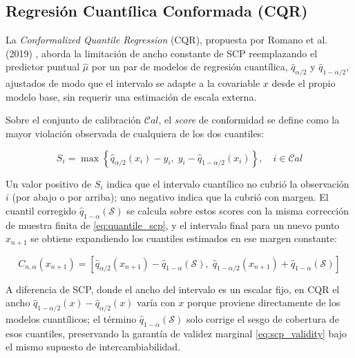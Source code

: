 \subsection{Regresión Cuantílica Conformada (CQR)}
\label{sec:cqr}

La \textit{Conformalized Quantile Regression} (CQR), propuesta por Romano et al. (2019) \cite{RomanoCQR}, aborda la limitación de ancho constante de SCP reemplazando el predictor puntual $\hat{\mu}$ por un par de modelos de regresión cuantílica, $\hat{q}_{\alpha/2}$ y $\hat{q}_{1-\alpha/2}$, ajustados de modo que el intervalo se adapte a la covariable $x$ desde el propio modelo base, sin requerir una estimación de escala externa.

Sobre el conjunto de calibración $\mathcal{C}al$, el \textit{score} de conformidad se define como la mayor violación observada de cualquiera de los dos cuantiles:

\begin{equation}
    S_i = \max\left\{\hat{q}_{\alpha/2}(x_i) - y_i,\; y_i - \hat{q}_{1-\alpha/2}(x_i)\right\}, \quad i \in \mathcal{C}al
    \label{eq:cqr_score}
\end{equation}

Un valor positivo de $S_i$ indica que el intervalo cuantílico no cubrió la observación $i$ (por abajo o por arriba); uno negativo indica que la cubrió con margen. El cuantil corregido $\hat{q}_{1-\alpha}(\mathcal{S})$ se calcula sobre estos scores con la misma corrección de muestra finita de \eqref{eq:quantile_scp}, y el intervalo final para un nuevo punto $x_{n+1}$ se obtiene expandiendo los cuantiles estimados en ese margen constante:

\begin{equation}
    C_{n,\alpha}(x_{n+1}) = \left[\hat{q}_{\alpha/2}(x_{n+1}) - \hat{q}_{1-\alpha}(\mathcal{S}),\; \hat{q}_{1-\alpha/2}(x_{n+1}) + \hat{q}_{1-\alpha}(\mathcal{S})\right]
    \label{eq:cqr_interval}
\end{equation}

A diferencia de SCP, donde el ancho del intervalo es un escalar fijo, en CQR el ancho $\hat{q}_{1-\alpha/2}(x) - \hat{q}_{\alpha/2}(x)$ varía con $x$ porque proviene directamente de los modelos cuantílicos; el término $\hat{q}_{1-\alpha}(\mathcal{S})$ solo corrige el sesgo de cobertura de esos cuantiles, preservando la garantía de validez marginal \eqref{eq:scp_validity} bajo el mismo supuesto de intercambiabilidad.

